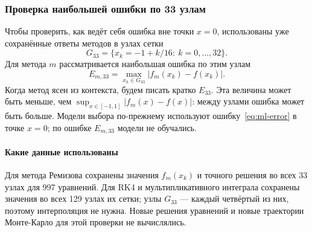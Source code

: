 \documentclass[14pt,a4paper]{extarticle}
\begin{document}
\clearpage
\subsubsection{Проверка наибольшей ошибки по 33 узлам}\label{sec:grid33}
Чтобы проверить, как ведёт себя ошибка вне точки $x=0$, использованы
уже сохранённые ответы методов в узлах сетки
\[
G_{33}=\{x_k=-1+k/16:\ k=0,\dots,32\}.
\]
Для метода $m$ рассматривается наибольшая ошибка по этим узлам
\begin{equation}\label{eq:grid33-error}
E_{m,33}=\max_{x_k\in G_{33}}|f_m(x_k)-f(x_k)|.
\end{equation}
Когда метод ясен из контекста, будем писать кратко $E_{33}$.
Эта величина может быть меньше, чем $\sup_{x\in[-1,1]}|f_m(x)-f(x)|$:
между узлами ошибка может быть больше. Модели выбора по-прежнему
используют ошибку~\eqref{eq:ml-error} в точке $x=0$; по ошибке
$E_{m,33}$ модели не обучались.

\paragraph{Какие данные использованы\\}
Для метода Ремизова сохранены значения $f_m(x_k)$ и точного решения
во всех 33 узлах для 997 уравнений. Для RK4 и мультипликативного
интеграла сохранены значения во всех 129 узлах их сетки; узлы $G_{33}$
--- каждый четвёртый из них, поэтому интерполяция не нужна. Новые
решения уравнений и новые траектории Монте-Карло для этой проверки
не вычислялись.

\begin{table}[!htbp]
\centering
\caption{Наибольшая ошибка $E_{m,33}$ по 33 узлам на общих 997 уравнениях.
Для Монте-Карло значений во всех узлах нет.}
\label{tab:grid33-common}
\end{table}
\end{document}
